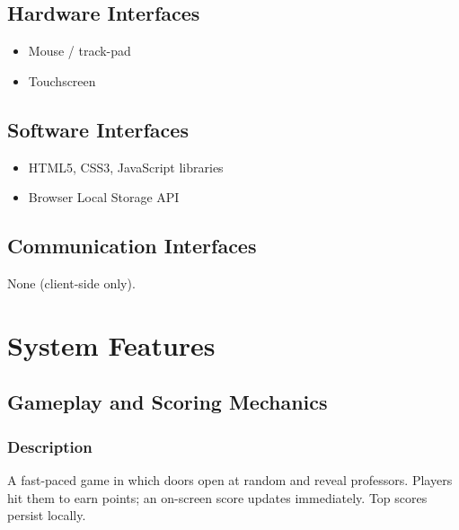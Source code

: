 \documentclass[11pt]{scrreprt}
\begin{document}
\section{Hardware Interfaces}
\begin{itemize}
  \item Mouse / track-pad
  \item Touchscreen
\end{itemize}

\section{Software Interfaces}
\begin{itemize}
  \item HTML5, CSS3, JavaScript libraries
  \item Browser Local Storage API
\end{itemize}

\section{Communication Interfaces}
None (client-side only).

\chapter{System Features}

\section{Gameplay and Scoring Mechanics}

\subsection{Description}
A fast-paced game in which doors open at random and reveal professors. Players hit them to earn points; an on-screen score updates immediately. Top scores persist locally.
\end{document}
